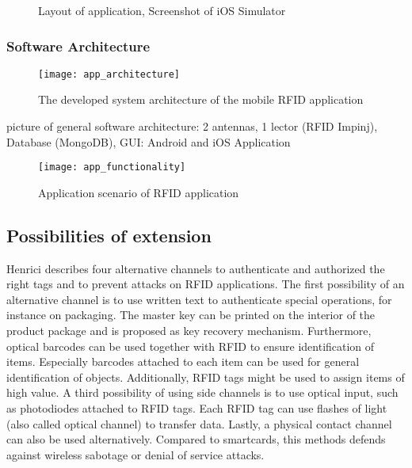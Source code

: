 \begin{figure}
\centering
{}
\caption{Layout of application, Screenshot of iOS Simulator}
\end{figure}




\subsubsection{Software Architecture}

\begin{figure}
\centering
\texttt{[image: app\_architecture]} 
\caption{\label{fig:apparchitecture}The developed system architecture of the mobile RFID application} 
\end{figure}

picture of general software architecture: 
2 antennas, 1 lector (RFID Impinj), Database (MongoDB), GUI: Android and  iOS Application 


\begin{figure}
\centering
\texttt{[image: app\_functionality]} 
\caption{\label{fig:appfunctionality}Application scenario of RFID application } 
\end{figure}

\subsection{Possibilities of extension}

Henrici \cite[p.121 ff.]{henrici} describes four alternative channels to authenticate and authorized the right tags and to prevent attacks on RFID applications. 
The first possibility of an alternative channel is to use written text to authenticate special operations, for instance on packaging. The master key can be printed on the interior of the product package and is proposed as key recovery mechanism.
Furthermore, optical barcodes can be used together with RFID to ensure identification of items. Especially barcodes attached to each item can be used for general identification of objects. Additionally, RFID tags might be used to assign items of high value.
A third possibility of using side channels is to use optical input, such as photodiodes attached to RFID tags. Each RFID tag can use flashes of light (also called optical channel) to transfer data.   
Lastly, a physical contact channel can also be used alternatively. Compared to smartcards, this methods defends against wireless sabotage or denial of service attacks.


















 

